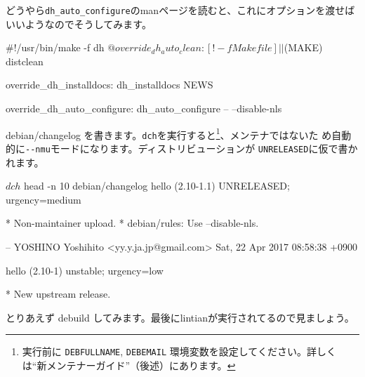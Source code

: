 \documentclass[mingoth,a4paper]{jsarticle}
\begin{document}
どうやら\verb|dh_auto_configure|のmanページを読むと、これにオプションを渡せばいいようなのでそうしてみます。

\begin{commandline}
#!/usr/bin/make -f
	dh $@

override_dh_auto_clean:
	[ ! -f Makefile ] || $(MAKE) distclean

override_dh_installdocs:
	dh_installdocs NEWS

override_dh_auto_configure:
	dh_auto_configure -- --disable-nls
\end{commandline}

debian/changelog を書きます。\verb|dch|を実行すると\footnote{実行前に
\texttt{DEBFULLNAME}, \texttt{DEBEMAIL} 環境変数を設定してください。詳しくは``新メンテナーガイド''（後述）にあります。}、メンテナではないた
め自動的に\verb|--nmu|モードになります。ディストリビューションが
\verb|UNRELEASED|に仮で書かれます。

\begin{commandline}
$ dch
$ head -n 10 debian/changelog
hello (2.10-1.1) UNRELEASED; urgency=medium

  * Non-maintainer upload.
  * debian/rules: Use --disable-nls.

 -- YOSHINO Yoshihito <yy.y.ja.jp@gmail.com>  Sat, 22 Apr 2017 08:58:38 +0900

hello (2.10-1) unstable; urgency=low

  * New upstream release.
\end{commandline}

とりあえず debuild してみます。最後にlintianが実行されてるので見ましょう。

\end{document}
